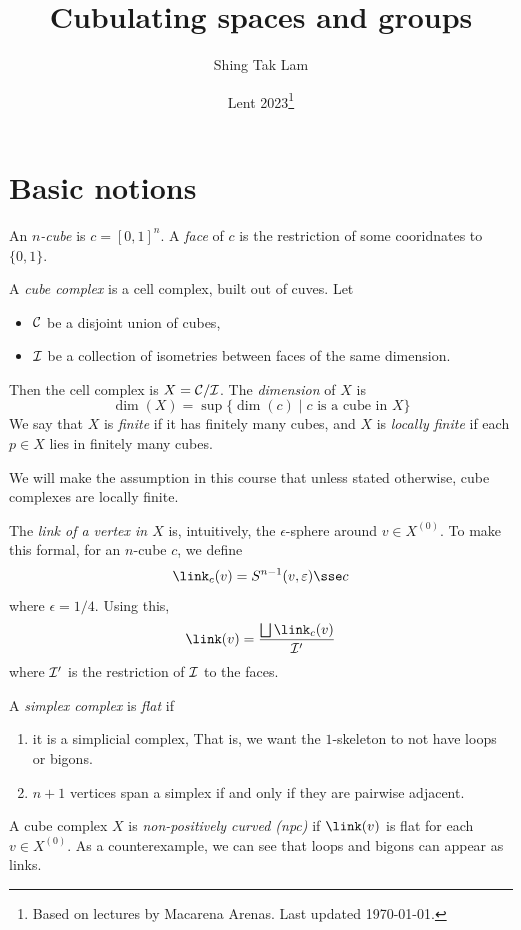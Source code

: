 \documentclass{article}
\title{Cubulating spaces and groups}
\author{Shing Tak Lam}
\date{Lent 2023\footnote{Based on lectures by Macarena Arenas. Last updated \today.}}
\begin{document}
\maketitle

\tableofcontents

\lec

\section{Basic notions}

An \emph{\(n\)-cube} is \(c = [0, 1]^n\). A \emph{face} of \(c\) is the restriction of some cooridnates to \(\{0, 1\}\).

A \emph{cube complex} is a cell complex, built out of cuves. Let
\begin{itemize}
    \item \(\mathcal{C}\) be a disjoint union of cubes,
    \item \(\mathcal{I}\) be a collection of isometries between faces of the same dimension.
\end{itemize}
Then the cell complex is \(X = \mathcal{C}/\mathcal{I}\). The \emph{dimension} of \(X\) is
\[\dim(X) = \sup\{\dim(c) \mid c \text{ is a cube in }X\}\]
We say that \(X\) is \emph{finite} if it has finitely many cubes, and \(X\) is \emph{locally finite} if each \(p \in X\) lies in finitely many cubes.

We will make the assumption in this course that unless stated otherwise, cube complexes are locally finite.

The \emph{link of a vertex in \(X\)} is, intuitively, the \(\epsilon\)-sphere around \(v \in X^{(0)}\). To make this formal, for an \(n\)-cube \(c\), we define
\[\link_c(v) = S^{n-1}(v, \epsilon) \sse c\]
where \(\epsilon = 1/4\). Using this,
\[\link(v) = \frac{\bigsqcup \link_c(v)}{\mcI'}\]
where \(\mathcal{I}'\) is the restriction of \(\mathcal{I}\) to the faces.

A \emph{simplex complex} is \emph{flat} if
\begin{enumerate}
    \item it is a simplicial complex, That is, we want the \(1\)-skeleton to not have loops or bigons.
    \item \(n + 1\) vertices span a simplex if and only if they are pairwise adjacent.
\end{enumerate}

A cube complex \(X\) is \emph{non-positively curved (npc)} if \(\link(v)\) is flat for each \(v \in X^{(0)}\). As a counterexample, we can see that loops and bigons can appear as links.
\end{document}
